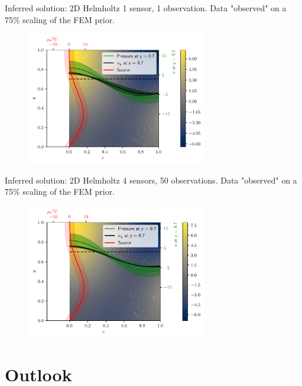 \documentclass[fleqn,11pt,aspectratio=43]{beamer}
\begin{document}
\begin{frame}{Inferred solution: 2D Helmholtz}
1 sensor, 1 observation. Data "observed" on a 75\% scaling of the FEM prior.
      	\begin{figure}[h]
		\begin{center}
		\includegraphics[width=0.7\textwidth]{SolutionCustomPosterior1P1O}
		\end{center}
		\end{figure}

	\end{frame}

\begin{frame}{Inferred solution: 2D Helmholtz}
4 sensors, 50 observations. Data "observed" on a 75\% scaling of the FEM prior.
      	\begin{figure}[h]
		\begin{center}
		\includegraphics[width=0.7\textwidth]{SolutionCustomPosterior4P50O}
		\end{center}
		\end{figure}

	\end{frame}


\section{Outlook}
\end{document}
